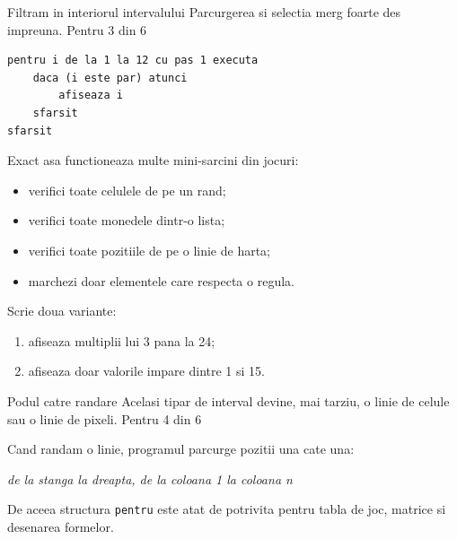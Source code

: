 \clearpage

\PageHeader
  {Filtram in interiorul intervalului}
  {Parcurgerea si selectia merg foarte des impreuna.}
  {Pentru 3 din 6}

\begin{examplebox}
\begin{lstlisting}[style=codequest]
pentru i de la 1 la 12 cu pas 1 executa
    daca (i este par) atunci
        afiseaza i
    sfarsit
sfarsit
\end{lstlisting}
\end{examplebox}

\begin{missionbox}
Exact asa functioneaza multe mini-sarcini din jocuri:
\begin{itemize}
\item verifici toate celulele de pe un rand;
\item verifici toate monedele dintr-o lista;
\item verifici toate pozitiile de pe o linie de harta;
\item marchezi doar elementele care respecta o regula.
\end{itemize}
\end{missionbox}

\begin{semibox}[Aplicam]
Scrie doua variante:
\begin{enumerate}
\item afiseaza multiplii lui 3 pana la 24;
\item afiseaza doar valorile impare dintre 1 si 15.
\end{enumerate}
\end{semibox}

\clearpage

\PageHeader
  {Podul catre randare}
  {Acelasi tipar de interval devine, mai tarziu, o linie de celule sau o linie de pixeli.}
  {Pentru 4 din 6}

\begin{missionbox}
Cand randam o linie, programul parcurge pozitii una cate una:
\begin{center}
\textit{de la stanga la dreapta, de la coloana 1 la coloana n}
\end{center}
De aceea structura \texttt{pentru} este atat de potrivita pentru tabla de joc, matrice si desenarea formelor.
\end{missionbox}

